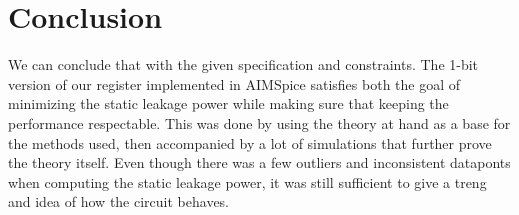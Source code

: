 \section{Conclusion}

We can conclude that with the given specification and constraints. The 1-bit version of our register implemented in AIMSpice satisfies both the goal of minimizing the static leakage power while making sure that keeping the performance respectable. This was done by using the theory at hand as a base for the methods used, then accompanied by a lot of simulations that further prove the theory itself. Even though there was a few outliers and inconsistent dataponts when computing the static leakage power, it was still sufficient to give a treng and idea of how the circuit behaves. 

